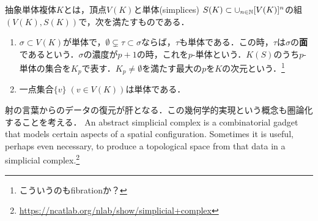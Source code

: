 \documentclass[uplatex,dvipdfmx]{jsreport}
\begin{document}
\begin{definition}
    抽象単体複体$K$とは，頂点$V(K)$と単体(simplices) $S(K)\subset\cup_{n\in\mathbb{N}}[V(K)]^n$の組$(V(K),S(K))$で，次を満たすものである．
    \begin{enumerate}
        \item $\sigma\subset V(K)$が単体で，$\emptyset\subsetneq\tau\subset\sigma$ならば，$\tau$も単体である．この時，$\tau$は$\sigma$の\textbf{面}であるという．$\sigma$の濃度が$p+1$の時，これを$p$-単体という．$K(S)$のうち$p$-単体の集合を$K_p$で表す．$K_p\ne\emptyset$を満たす最大の$p$を$K$の次元という．\footnote{こういうのもfibrationか？}
        \item 一点集合$\{v\}\;(v\in V(K))$は単体である．
    \end{enumerate}
\end{definition}
\begin{remarks}
    射の言葉からのデータの復元が肝となる．この幾何学的実現という概念も圏論化することを考える．
    An abstract simplicial complex is a combinatorial gadget that models certain aspects of a spatial configuration. Sometimes it is useful, perhaps even necessary, to produce a topological space from that data in a simplicial complex.\footnote{\url{https://ncatlab.org/nlab/show/simplicial+complex}}
\end{remarks}
\end{document}
